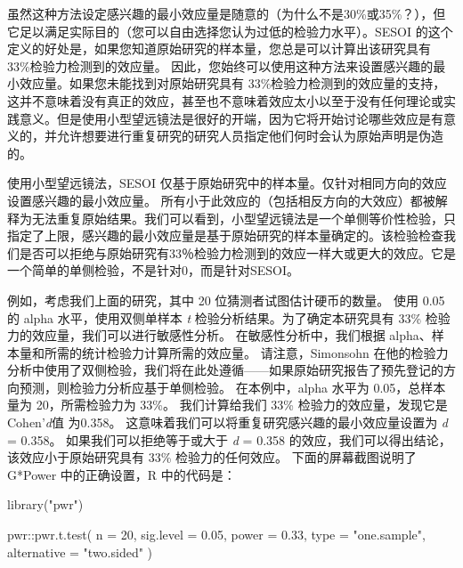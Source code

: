 \documentclass[
  letterpaper,
  DIV=11,
  numbers=noendperiod]{scrreprt}
\newenvironment{Shaded}{\begin{snugshade}}{\end{snugshade}}
\newcommand{\AttributeTok}[1]{\textcolor[rgb]{0.40,0.45,0.13}{#1}}
\newcommand{\DecValTok}[1]{\textcolor[rgb]{0.68,0.00,0.00}{#1}}
\newcommand{\FloatTok}[1]{\textcolor[rgb]{0.68,0.00,0.00}{#1}}
\newcommand{\FunctionTok}[1]{\textcolor[rgb]{0.28,0.35,0.67}{#1}}
\newcommand{\NormalTok}[1]{\textcolor[rgb]{0.00,0.23,0.31}{#1}}
\newcommand{\SpecialCharTok}[1]{\textcolor[rgb]{0.37,0.37,0.37}{#1}}
\newcommand{\StringTok}[1]{\textcolor[rgb]{0.13,0.47,0.30}{#1}}
\begin{document}
虽然这种方法设定感兴趣的最小效应量是随意的（为什么不是30\%或35\%？），但它足以满足实际目的（您可以自由选择您认为过低的检验力水平）。SESOI
的这个定义的好处是，如果您知道原始研究的样本量，您总是可以计算出该研究具有
33\%检验力检测到的效应量。
因此，您始终可以使用这种方法来设置感兴趣的最小效应量。如果您未能找到对原始研究具有
33\%检验力检测到的效应量的支持，这并不意味着没有真正的效应，甚至也不意味着效应太小以至于没有任何理论或实践意义。但是使用小型望远镜法是很好的开端，因为它将开始讨论哪些效应是有意义的，并允许想要进行重复研究的研究人员指定他们何时会认为原始声明是伪造的。

使用小型望远镜法，SESOI
仅基于原始研究中的样本量。仅针对相同方向的效应设置感兴趣的最小效应量。
所有小于此效应的（包括相反方向的大效应）都被解释为无法重复原始结果。我们可以看到，小型望远镜法是一个单侧等价性检验，只指定了上限，感兴趣的最小效应量是基于原始研究的样本量确定的。该检验检查我们是否可以拒绝与原始研究有33％检验力检测到的效应一样大或更大的效应。它是一个简单的单侧检验，不是针对0，而是针对SESOI。

例如，考虑我们上面的研究，其中 20 位猜测者试图估计硬币的数量。 使用 0.05
的 alpha 水平，使用双侧单样本 \emph{t} 检验分析结果。为了确定本研究具有
33\% 检验力的效应量，我们可以进行敏感性分析。 在敏感性分析中，我们根据
alpha、样本量和所需的统计检验力计算所需的效应量。 请注意，Simonsohn
在他的检验力分析中使用了双侧检验，我们将在此处遵循------如果原始研究报告了预先登记的方向预测，则检验力分析应基于单侧检验。
在本例中，alpha 水平为 0.05，总样本量为 20，所需检验力为 33\%。
我们计算给我们 33\% 检验力的效应量，发现它是 Cohen'\emph{d}值 为0.358。
这意味着我们可以将重复研究感兴趣的最小效应量设置为 \emph{d} = 0.358。
如果我们可以拒绝等于或大于 \emph{d} = 0.358
的效应，我们可以得出结论，该效应小于原始研究具有 33\% 检验力的任何效应。
下面的屏幕截图说明了 G*Power 中的正确设置，R 中的代码是：

\begin{Shaded}
\begin{Highlighting}[]
\FunctionTok{library}\NormalTok{(}\StringTok{"pwr"}\NormalTok{)}

\NormalTok{pwr}\SpecialCharTok{::}\FunctionTok{pwr.t.test}\NormalTok{(}
  \AttributeTok{n =} \DecValTok{20}\NormalTok{, }
  \AttributeTok{sig.level =} \FloatTok{0.05}\NormalTok{, }
  \AttributeTok{power =} \FloatTok{0.33}\NormalTok{, }
  \AttributeTok{type =} \StringTok{"one.sample"}\NormalTok{,}
  \AttributeTok{alternative =} \StringTok{"two.sided"}
\NormalTok{)}
\end{Highlighting}
\end{Shaded}
\end{document}
